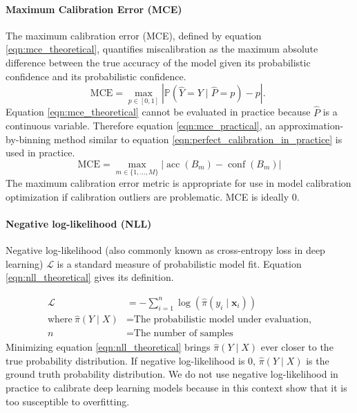 \paragraph{Maximum Calibration Error (MCE)}
The maximum calibration error (MCE), defined by equation \ref{eqn:mce_theoretical}, quantifies miscalibration as the maximum absolute difference between the true accuracy of the model given its probabilistic confidence and its probabilistic confidence.
\begin{equation}
  \label{eqn:mce_theoretical}
  \mathrm{MCE}=\max _{p \in[0,1]}|\mathbb{P}(\hat{Y}=Y \mid \hat{P}=p)-p| \text {. }
\end{equation}
Equation \ref{eqn:mce_theoretical} cannot be evaluated in practice because $\hat{P}$ is a continuous variable. Therefore equation \ref{eqn:mce_practical}, an approximation-by-binning method similar to equation \ref{eqn:perfect_calibration_in_practice} is used in practice.
\begin{equation}
  \label{eqn:mce_practical}
  \mathrm{MCE}=\max _{m \in\{1, \ldots, M\}}\left|\operatorname{acc}\left(B_{m}\right)-\operatorname{conf}\left(B_{m}\right)\right|
\end{equation}
The maximum calibration error metric is appropriate for use in model calibration optimization if calibration outliers are problematic. MCE is ideally 0.

\paragraph{Negative log-likelihood (NLL)}
Negative log-likelihood (also commonly known as cross-entropy loss in deep learning) $\mathcal{L}$ is a standard measure of probabilistic model fit. Equation \ref{eqn:nll_theoretical} gives its definition.

\begin{align}
  \label{eqn:nll_theoretical}
  \mathcal{L} &= -\sum_{i=1}^{n} \log \left(\hat{\pi}\left(y_{i} \mid \mathbf{x}_{i}\right)\right) \\ \nonumber
  \text{where}~\hat{\pi}(Y \mid X) &= \text{The probabilistic model under evaluation,} \\ \nonumber
  n &= \text{The number of samples}
\end{align}
Minimizing equation \ref{eqn:nll_theoretical} brings $\hat{\pi}(Y \mid X)$ ever closer to the true probability distribution. If negative log-likelihood is 0, $\hat{\pi}(Y \mid X)$ is the ground truth probability distribution. We do not use negative log-likelihood in practice to calibrate deep learning models because in this context \cite{guo2017calibration} show that it is too susceptible to overfitting.

